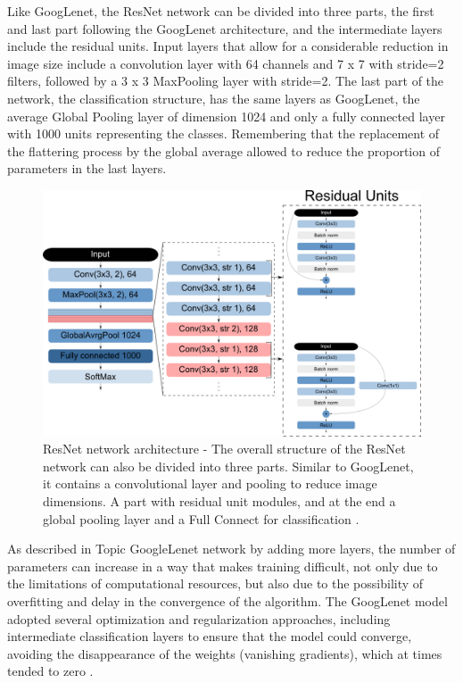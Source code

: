 Like GoogLenet, the ResNet network can be divided into three parts, the first and last part following the GoogLenet architecture, and the intermediate layers include the residual units. Input layers that allow for a considerable reduction in image size include a convolution layer with 64 channels and 7 x 7 with stride=2 filters, followed by a 3 x 3 MaxPooling layer with stride=2. The last part of the network, the classification structure, has the same layers as GoogLenet, the average Global Pooling layer of dimension 1024 and only a fully connected layer with 1000 units representing the classes. Remembering that the replacement of the flattering process by the global average allowed to reduce the proportion of parameters in the last layers.

\begin{figure}
    \centering
    \includegraphics[scale=0.4]{images/figure135.png}
    \caption{ResNet network architecture - The overall structure of the ResNet network can also be divided into three parts. Similar to GoogLenet, it contains a convolutional layer and pooling to reduce image dimensions. A part with residual unit modules, and at the end a global pooling layer and a Full Connect for classification \cite{geron2019}.}
    \label{fig:figure135}
\end{figure}

As described in Topic GoogleLenet network by adding more layers, the number of parameters can increase in a way that makes training difficult, not only due to the limitations of computational resources, but also due to the possibility of overfitting and delay in the convergence of the algorithm. The GoogLenet model adopted several optimization and regularization approaches, including intermediate classification layers to ensure that the model could converge, avoiding the disappearance of the weights (vanishing gradients), which at times tended to zero \cite{geron2019}.

